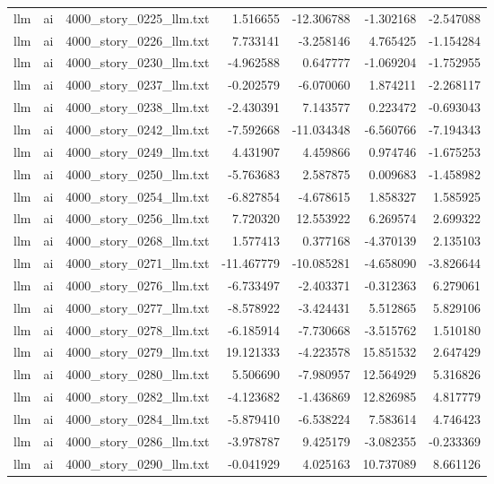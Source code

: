 \begin{longtable}{lllrrrr}
llm & ai & 4000\_story\_0225\_llm.txt & 1.516655 & -12.306788 & -1.302168 & -2.547088 \\
llm & ai & 4000\_story\_0226\_llm.txt & 7.733141 & -3.258146 & 4.765425 & -1.154284 \\
llm & ai & 4000\_story\_0230\_llm.txt & -4.962588 & 0.647777 & -1.069204 & -1.752955 \\
llm & ai & 4000\_story\_0237\_llm.txt & -0.202579 & -6.070060 & 1.874211 & -2.268117 \\
llm & ai & 4000\_story\_0238\_llm.txt & -2.430391 & 7.143577 & 0.223472 & -0.693043 \\
llm & ai & 4000\_story\_0242\_llm.txt & -7.592668 & -11.034348 & -6.560766 & -7.194343 \\
llm & ai & 4000\_story\_0249\_llm.txt & 4.431907 & 4.459866 & 0.974746 & -1.675253 \\
llm & ai & 4000\_story\_0250\_llm.txt & -5.763683 & 2.587875 & 0.009683 & -1.458982 \\
llm & ai & 4000\_story\_0254\_llm.txt & -6.827854 & -4.678615 & 1.858327 & 1.585925 \\
llm & ai & 4000\_story\_0256\_llm.txt & 7.720320 & 12.553922 & 6.269574 & 2.699322 \\
llm & ai & 4000\_story\_0268\_llm.txt & 1.577413 & 0.377168 & -4.370139 & 2.135103 \\
llm & ai & 4000\_story\_0271\_llm.txt & -11.467779 & -10.085281 & -4.658090 & -3.826644 \\
llm & ai & 4000\_story\_0276\_llm.txt & -6.733497 & -2.403371 & -0.312363 & 6.279061 \\
llm & ai & 4000\_story\_0277\_llm.txt & -8.578922 & -3.424431 & 5.512865 & 5.829106 \\
llm & ai & 4000\_story\_0278\_llm.txt & -6.185914 & -7.730668 & -3.515762 & 1.510180 \\
llm & ai & 4000\_story\_0279\_llm.txt & 19.121333 & -4.223578 & 15.851532 & 2.647429 \\
llm & ai & 4000\_story\_0280\_llm.txt & 5.506690 & -7.980957 & 12.564929 & 5.316826 \\
llm & ai & 4000\_story\_0282\_llm.txt & -4.123682 & -1.436869 & 12.826985 & 4.817779 \\
llm & ai & 4000\_story\_0284\_llm.txt & -5.879410 & -6.538224 & 7.583614 & 4.746423 \\
llm & ai & 4000\_story\_0286\_llm.txt & -3.978787 & 9.425179 & -3.082355 & -0.233369 \\
llm & ai & 4000\_story\_0290\_llm.txt & -0.041929 & 4.025163 & 10.737089 & 8.661126 \\

\end{longtable}
